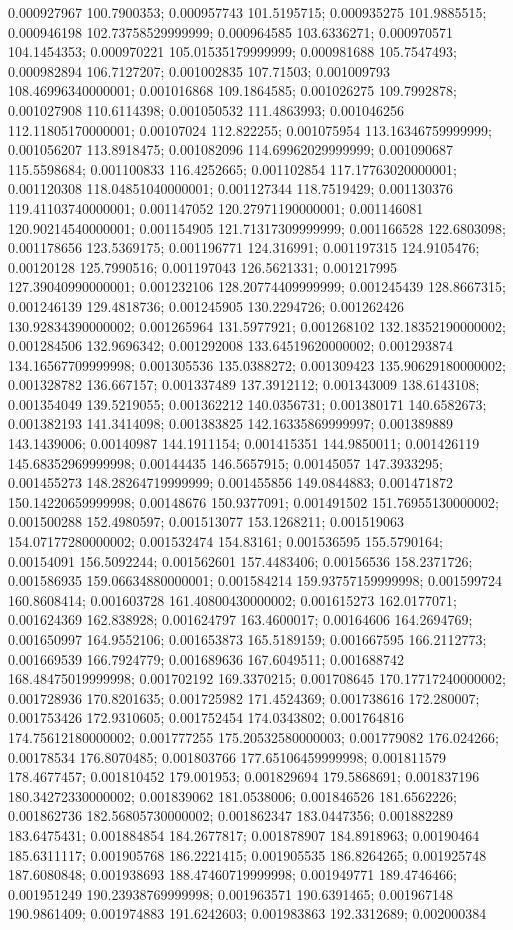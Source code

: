 0.000927967 100.7900353; 0.000957743 101.5195715; 0.000935275 101.9885515; 0.000946198 102.73758529999999; 0.000964585 103.6336271; 0.000970571 104.1454353; 0.000970221 105.01535179999999; 0.000981688 105.7547493; 0.000982894 106.7127207; 0.001002835 107.71503; 0.001009793 108.46996340000001; 0.001016868 109.1864585; 0.001026275 109.7992878; 0.001027908 110.6114398; 0.001050532 111.4863993; 0.001046256 112.11805170000001; 0.00107024 112.822255; 0.001075954 113.16346759999999; 0.001056207 113.8918475; 0.001082096 114.69962029999999; 0.001090687 115.5598684; 0.001100833 116.4252665; 0.001102854 117.17763020000001; 0.001120308 118.04851040000001; 0.001127344 118.7519429; 0.001130376 119.41103740000001; 0.001147052 120.27971190000001; 0.001146081 120.90214540000001; 0.001154905 121.71317309999999; 0.001166528 122.6803098; 0.001178656 123.5369175; 0.001196771 124.316991; 0.001197315 124.9105476; 0.00120128 125.7990516; 0.001197043 126.5621331; 0.001217995 127.39040990000001; 0.001232106 128.20774409999999; 0.001245439 128.8667315; 0.001246139 129.4818736; 0.001245905 130.2294726; 0.001262426 130.92834390000002; 0.001265964 131.5977921; 0.001268102 132.18352190000002; 0.001284506 132.9696342; 0.001292008 133.64519620000002; 0.001293874 134.16567709999998; 0.001305536 135.0388272; 0.001309423 135.90629180000002; 0.001328782 136.667157; 0.001337489 137.3912112; 0.001343009 138.6143108; 0.001354049 139.5219055; 0.001362212 140.0356731; 0.001380171 140.6582673; 0.001382193 141.3414098; 0.001383825 142.16335869999997; 0.001389889 143.1439006; 0.00140987 144.1911154; 0.001415351 144.9850011; 0.001426119 145.68352969999998; 0.00144435 146.5657915; 0.00145057 147.3933295; 0.001455273 148.28264719999999; 0.001455856 149.0844883; 0.001471872 150.14220659999998; 0.00148676 150.9377091; 0.001491502 151.76955130000002; 0.001500288 152.4980597; 0.001513077 153.1268211; 0.001519063 154.07177280000002; 0.001532474 154.83161; 0.001536595 155.5790164; 0.00154091 156.5092244; 0.001562601 157.4483406; 0.00156536 158.2371726; 0.001586935 159.06634880000001; 0.001584214 159.93757159999998; 0.001599724 160.8608414; 0.001603728 161.40800430000002; 0.001615273 162.0177071; 0.001624369 162.838928; 0.001624797 163.4600017; 0.00164606 164.2694769; 0.001650997 164.9552106; 0.001653873 165.5189159; 0.001667595 166.2112773; 0.001669539 166.7924779; 0.001689636 167.6049511; 0.001688742 168.48475019999998; 0.001702192 169.3370215; 0.001708645 170.17717240000002; 0.001728936 170.8201635; 0.001725982 171.4524369; 0.001738616 172.280007; 0.001753426 172.9310605; 0.001752454 174.0343802; 0.001764816 174.75612180000002; 0.001777255 175.20532580000003; 0.001779082 176.024266; 0.00178534 176.8070485; 0.001803766 177.65106459999998; 0.001811579 178.4677457; 0.001810452 179.001953; 0.001829694 179.5868691; 0.001837196 180.34272330000002; 0.001839062 181.0538006; 0.001846526 181.6562226; 0.001862736 182.56805730000002; 0.001862347 183.0447356; 0.001882289 183.6475431; 0.001884854 184.2677817; 0.001878907 184.8918963; 0.00190464 185.6311117; 0.001905768 186.2221415; 0.001905535 186.8264265; 0.001925748 187.6080848; 0.001938693 188.47460719999998; 0.001949771 189.4746466; 0.001951249 190.23938769999998; 0.001963571 190.6391465; 0.001967148 190.9861409; 0.001974883 191.6242603; 0.001983863 192.3312689; 0.002000384 